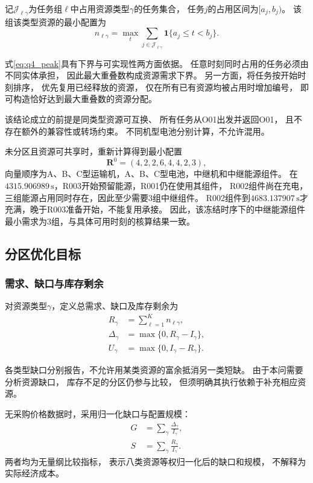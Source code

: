\documentclass[bwprint]{gmcmthesis}
\begin{document}
记$\mathcal{J}_{\ell\gamma}$为任务组$\ell$中占用资源类型$\gamma$的任务集合，
任务$j$的占用区间为$[a_j,b_j)$。
该组该类型资源的最小配置为
\begin{equation}
n_{\ell\gamma}
=
\max_t
\sum_{j\in\mathcal{J}_{\ell\gamma}}
\mathbf{1}\{a_j\leq t<b_j\}.
\label{eq:q4_peak}
\end{equation}

式\eqref{eq:q4_peak}具有下界与可实现性两方面依据。
任意时刻同时占用的任务必须由不同实体承担，
因此最大重叠数构成资源需求下界。
另一方面，将任务按开始时刻排序，
优先复用已经释放的资源，
仅在所有已有资源均被占用时增加编号，
即可构造恰好达到最大重叠数的资源分配。

该结论成立的前提是同类型资源可互换、
所有任务从O01出发并返回O01，
且不存在额外的兼容性或转场约束。
不同机型电池分别计算，不允许混用。

未分区且资源可共享时，重新计算得到最小配置
\begin{equation}
\boldsymbol R^0=(4,2,2,6,4,4,2,3),
\end{equation}
向量顺序为A、B、C型运输机，A、B、C型电池，中继机和中继能源组件。
在$4315.906989\,\mathrm{s}$，R003开始预留能源，R001仍在使用其组件，
R002组件尚在充电，三组能源占用同时存在，因此至少需要3组中继组件。
R002组件到$4683.137907\,\mathrm{s}$才充满，晚于R003准备开始，不能复用承接。
因此，该冻结时序下的中继能源组件最小需求为3组，与具体可用时刻的核算结果一致。

\subsection{分区优化目标}

\subsubsection{需求、缺口与库存剩余}

对资源类型$\gamma$，定义总需求、缺口及库存剩余为
\begin{align}
R_\gamma&=\sum_{\ell=1}^{K}n_{\ell\gamma},\\
\Delta_\gamma&=\max\{0,R_\gamma-I_\gamma\},\\
U_\gamma&=\max\{0,I_\gamma-R_\gamma\}.
\end{align}

各类型缺口分别报告，不允许用某类资源的富余抵消另一类短缺。
由于本问需要分析资源缺口，
库存不足的分区仍参与比较，
但须明确其执行依赖于补充相应资源。

无采购价格数据时，采用归一化缺口与配置规模：
\begin{align}
G&=\sum_{\gamma}\frac{\Delta_\gamma}{I_\gamma},\\
S&=\sum_{\gamma}\frac{R_\gamma}{I_\gamma}.
\end{align}
两者均为无量纲比较指标，
表示八类资源等权归一化后的缺口和规模，
不解释为实际经济成本。
\end{document}
